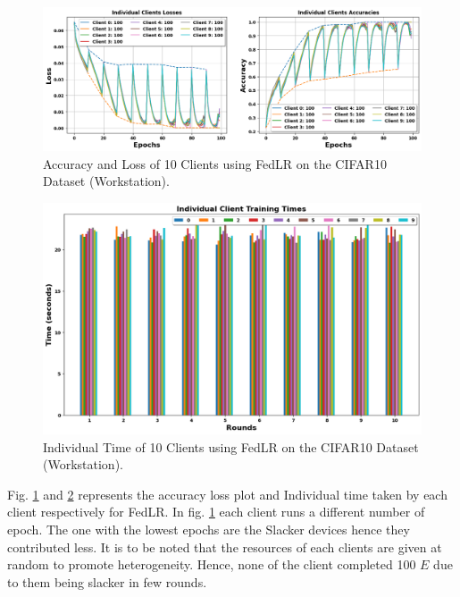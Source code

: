 \documentclass[conference]{IEEEtran}
\begin{document}
\begin{figure}[htp!]
	\centering
	\includegraphics[scale=.28]{Images/NEWGRAPHS/3.png}
	\caption{Accuracy and Loss of 10 Clients using FedLR on the CIFAR10 Dataset (Workstation).}
	\label{FedLRC10}
\end{figure}

\begin{figure}[htp!]
	\centering
	\includegraphics[scale=.3]{Images/NEWGRAPHS/4.png}
	\caption{Individual Time of 10 Clients using FedLR on the CIFAR10 Dataset (Workstation).}
	\label{FedLRTimeC10}


\end{figure}
Fig. \ref{FedLRC10} and \ref{FedLRTimeC10} represents the accuracy loss plot and Individual time taken by each client respectively for FedLR. In fig. \ref{FedLRC10} each client runs a different number of epoch. The one with the lowest epochs are the Slacker devices hence they contributed less. It is to be noted that the resources of each clients are given at random to promote heterogeneity. Hence, none of the client completed 100 $E$ due to them being slacker in few rounds.
\end{document}
